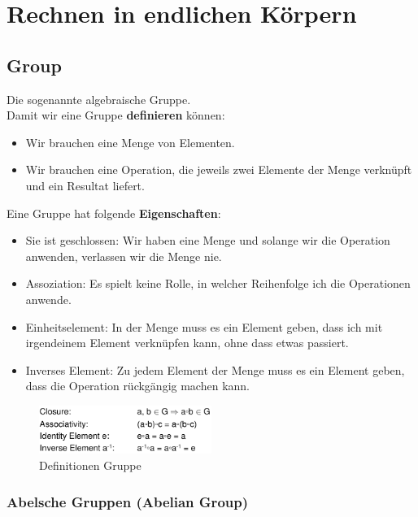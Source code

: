 \hypertarget{rechnen-in-endlichen-kuxf6rpern}{%
\section{Rechnen in endlichen Körpern}\label{rechnen-in-endlichen-kuxf6rpern}}

\hypertarget{group}{%
\subsection{Group}\label{group}}

Die sogenannte algebraische Gruppe.\\
Damit wir eine Gruppe \textbf{definieren} können: 
\begin{itemize}
    \item Wir brauchen eine Menge von Elementen.
    \item Wir brauchen eine Operation, die jeweils zwei Elemente der Menge verknüpft und ein Resultat liefert.
\end{itemize}

Eine Gruppe hat folgende \textbf{Eigenschaften}: 
\begin{itemize}
    \item Sie ist geschlossen: Wir haben eine Menge und solange wir die Operation anwenden, verlassen wir die Menge nie.
    \item Assoziation: Es spielt keine Rolle, in welcher Reihenfolge ich die Operationen anwende.
    \item Einheitselement: In der Menge muss es ein Element geben, dass ich mit irgendeinem Element verknüpfen kann, ohne dass etwas passiert.
    \item Inverses Element: Zu jedem Element der Menge muss es ein Element geben, dass die Operation rückgängig machen kann.
\end{itemize}

\begin{figure}[H]
\centering
\includegraphics[width=0.5\textwidth]{figures/algebraischeGruppe.png}
\caption{Definitionen Gruppe}
\end{figure}

\hypertarget{abelsche-gruppen-abelian-group}{%
\subsubsection{Abelsche Gruppen (Abelian
Group)}\label{abelsche-gruppen-abelian-group}}


